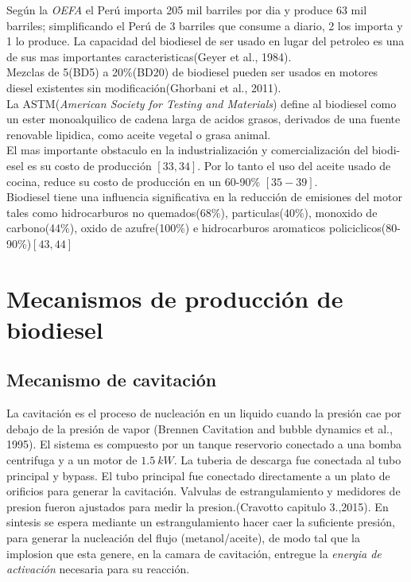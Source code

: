 \documentclass[a4paper,10pt]{article}
\begin{document}
Según la \emph{OEFA} el Perú importa 205 mil barriles por dia y produce 63 mil barriles; simplificando el Perú de 3 barriles que consume a diario, 2 los importa y 1 lo produce.
La capacidad del biodiesel de ser usado en lugar del petroleo es una de sus mas importantes caracteristicas(Geyer et al., 1984). \\
Mezclas de 5(BD5) a 20\%(BD20) de biodiesel pueden ser usados en motores diesel existentes sin modificación(Ghorbani et al., 2011).\\
La ASTM(\emph{American Society for Testing and Materials}) define al biodiesel como un ester monoalquilico de cadena larga de acidos grasos, derivados de una fuente renovable lipidica, como aceite vegetal o grasa animal.\\
El mas importante obstaculo en la industrialización y comercialización del biodi- esel es su costo de producción $[33,34]$. Por lo tanto el uso del aceite usado de cocina, reduce su costo de producción en un 60-90\% $[35-39]$. \\
Biodiesel tiene una influencia significativa en la reducción de emisiones del motor tales como hidrocarburos no quemados(68\%), particulas(40\%), monoxido de carbono(44\%), oxido de azufre(100\%) e hidrocarburos aromaticos policiclicos(80-90\%)$[43,44]$

\section{Mecanismos de producción de biodiesel}

\subsection{Mecanismo de cavitación}
La cavitación es el proceso de nucleación en un liquido cuando la presión cae por debajo de la presión de vapor (Brennen Cavitation and bubble dynamics et al., 1995).
El sistema es compuesto por un tanque reservorio conectado a una bomba centrifuga y a un motor de $1.5\:kW$. La tuberia de descarga fue conectada al tubo principal y  bypass. El tubo principal fue conectado directamente a un plato de orificios para generar la cavitación. Valvulas de estrangulamiento y medidores de presion fueron ajustados para medir la presion.(Cravotto capitulo 3.,2015). En sintesis se espera mediante un estrangulamiento hacer caer la suficiente presión, para generar la nucleación del flujo (metanol/aceite), de modo tal que la implosion que esta genere, en la camara de cavitación, entregue la \emph{energia de activación} necesaria para su reacción.
\end{document}
